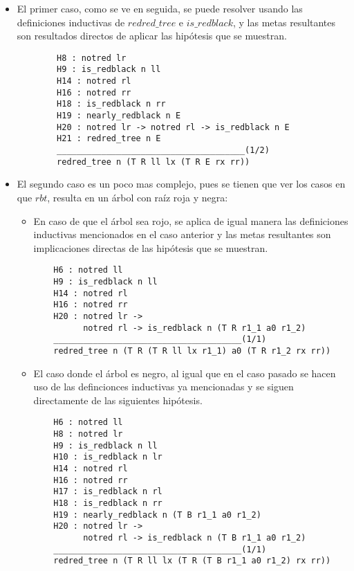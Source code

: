 \begin{itemize}
    \item El primer caso, como se ve en seguida, se puede resolver usando las definiciones
    inductivas de \hyperref[inductive_isRedB]{$redred\_tree$} e 
    \hyperref[inductive_isRedB]{$is\_redblack$}, y las metas resultantes son resultados directos de 
    aplicar las hipótesis que se muestran.
    \begin{verbatim}
        H8 : notred lr
        H9 : is_redblack n ll
        H14 : notred rl
        H16 : notred rr
        H18 : is_redblack n rr
        H19 : nearly_redblack n E
        H20 : notred lr -> notred rl -> is_redblack n E
        H21 : redred_tree n E
        ______________________________________(1/2)
        redred_tree n (T R ll lx (T R E rx rr))
    \end{verbatim}
    \item El segundo caso es un poco mas complejo, pues se tienen que ver los casos en que $rbt$,
    resulta en un \'arbol con raíz roja y negra:
    \begin{itemize}
        \item En caso de que el \'arbol sea rojo, se aplica de igual manera las definiciones
        inductivas mencionados en el caso anterior y las metas resultantes son implicaciones
        directas de las hipótesis que se muestran.
    \begin{verbatim}
    H6 : notred ll
    H9 : is_redblack n ll
    H14 : notred rl
    H16 : notred rr
    H20 : notred lr ->
          notred rl -> is_redblack n (T R r1_1 a0 r1_2)
    ______________________________________(1/1)
    redred_tree n (T R (T R ll lx r1_1) a0 (T R r1_2 rx rr))
    \end{verbatim}
        \item El caso donde el \'arbol es negro, al igual que en el caso pasado se hacen uso de
        las defincionces inductivas ya mencionadas y se siguen directamente de las siguientes
        hipótesis.
    \begin{verbatim}
    H6 : notred ll
    H8 : notred lr
    H9 : is_redblack n ll
    H10 : is_redblack n lr
    H14 : notred rl
    H16 : notred rr
    H17 : is_redblack n rl
    H18 : is_redblack n rr
    H19 : nearly_redblack n (T B r1_1 a0 r1_2)
    H20 : notred lr ->
          notred rl -> is_redblack n (T B r1_1 a0 r1_2)
    ______________________________________(1/1)
    redred_tree n (T R ll lx (T R (T B r1_1 a0 r1_2) rx rr))
    \end{verbatim}
    \end{itemize}
\end{itemize}

